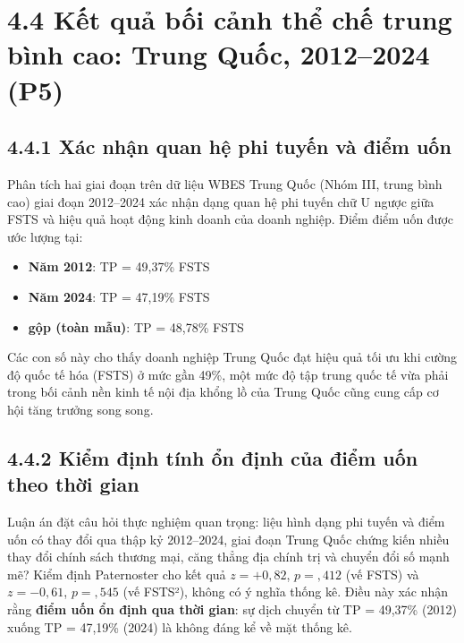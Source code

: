 \documentclass[
  a4paper,
  13pt]{extreport}
\providecommand{\tightlist}{%
  \setlength{\itemsep}{0pt}\setlength{\parskip}{0pt}}
\begin{document}
\hypertarget{kux1ebft-quux1ea3-bux1ed1i-cux1ea3nh-thux1ec3-chux1ebf-trung-buxecnh-cao-trung-quux1ed1c-20122024-p5}{%
\section{4.4 Kết quả bối cảnh thể chế trung bình cao: Trung Quốc,
2012--2024
(P5)}\label{kux1ebft-quux1ea3-bux1ed1i-cux1ea3nh-thux1ec3-chux1ebf-trung-buxecnh-cao-trung-quux1ed1c-20122024-p5}}

\hypertarget{xuxe1c-nhux1eadn-quan-hux1ec7-phi-tuyux1ebfn-vuxe0-ux111iux1ec3m-uux1ed1n}{%
\subsection{4.4.1 Xác nhận quan hệ phi tuyến và điểm
uốn}\label{xuxe1c-nhux1eadn-quan-hux1ec7-phi-tuyux1ebfn-vuxe0-ux111iux1ec3m-uux1ed1n}}

Phân tích hai giai đoạn trên dữ liệu WBES Trung Quốc (Nhóm III, trung
bình cao) giai đoạn 2012--2024 xác nhận dạng quan hệ phi tuyến chữ U
ngược giữa FSTS và hiệu quả hoạt động kinh doanh của doanh nghiệp. Điểm
điểm uốn được ước lượng tại:

\begin{itemize}
\tightlist
\item
  \textbf{Năm 2012}: TP = 49,37\% FSTS
\item
  \textbf{Năm 2024}: TP = 47,19\% FSTS
\item
  \textbf{gộp (toàn mẫu)}: TP = 48,78\% FSTS
\end{itemize}

Các con số này cho thấy doanh nghiệp Trung Quốc đạt hiệu quả tối ưu khi
cường độ quốc tế hóa (FSTS) ở mức gần 49\%, một mức độ tập trung quốc tế
vừa phải trong bối cảnh nền kinh tế nội địa khổng lồ của Trung Quốc cũng
cung cấp cơ hội tăng trưởng song song.

\hypertarget{kiux1ec3m-ux111ux1ecbnh-tuxednh-ux1ed5n-ux111ux1ecbnh-cux1ee7a-ux111iux1ec3m-uux1ed1n-theo-thux1eddi-gian}{%
\subsection{4.4.2 Kiểm định tính ổn định của điểm uốn theo thời
gian}\label{kiux1ec3m-ux111ux1ecbnh-tuxednh-ux1ed5n-ux111ux1ecbnh-cux1ee7a-ux111iux1ec3m-uux1ed1n-theo-thux1eddi-gian}}

Luận án đặt câu hỏi thực nghiệm quan trọng: liệu hình dạng phi tuyến và
điểm uốn có thay đổi qua thập kỷ 2012--2024, giai đoạn Trung Quốc chứng
kiến nhiều thay đổi chính sách thương mại, căng thẳng địa chính trị và
chuyển đổi số mạnh mẽ? Kiểm định Paternoster cho kết quả
\(z = +0{,}82\), \(p = {,}412\) (vế FSTS) và \(z = -0{,}61\),
\(p = {,}545\) (vế FSTS²), không có ý nghĩa thống kê. Điều này xác nhận
rằng \textbf{điểm uốn ổn định qua thời gian}: sự dịch chuyển từ TP =
49,37\% (2012) xuống TP = 47,19\% (2024) là không đáng kể về mặt thống
kê.
\end{document}
